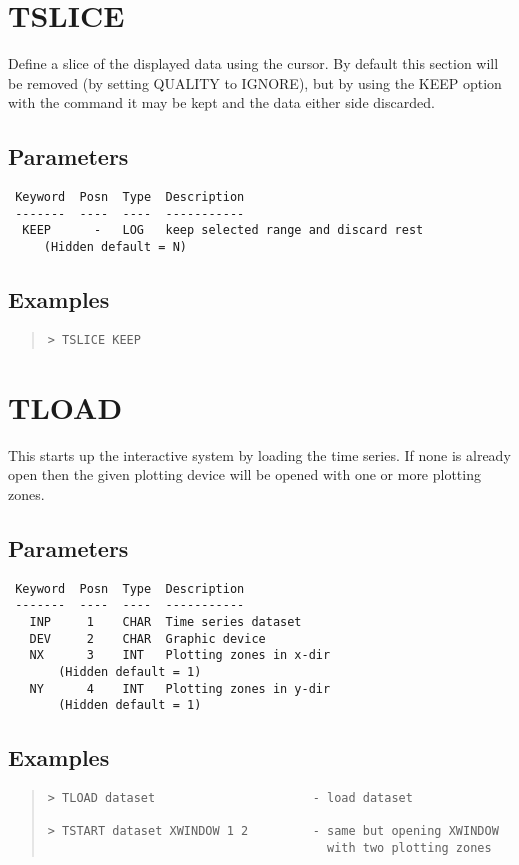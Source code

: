 \documentclass{book}
\renewcommand{\_}{{\tt\char'137}}     %
\begin{document}
\section{TSLICE}
Define a slice of the displayed data using the cursor. By
default this section will be removed (by setting QUALITY to IGNORE),
but by using the KEEP option with the command it may be kept and
the data either side discarded.

\subsection{Parameters}
\begin{verbatim}
 Keyword  Posn  Type  Description
 -------  ----  ----  -----------
  KEEP      -   LOG   keep selected range and discard rest
     (Hidden default = N)

\end{verbatim}\subsection{Examples}
\begin{quote}\begin{verbatim}
> TSLICE KEEP
\end{verbatim}\end{quote}
\section{TLOAD}
This starts up the interactive system by loading the time series.
If none is already open then the given plotting device will be opened
with one or more plotting zones.

\subsection{Parameters}
\begin{verbatim}
 Keyword  Posn  Type  Description
 -------  ----  ----  -----------
   INP     1    CHAR  Time series dataset
   DEV     2    CHAR  Graphic device
   NX      3    INT   Plotting zones in x-dir
       (Hidden default = 1)
   NY      4    INT   Plotting zones in y-dir
       (Hidden default = 1)

\end{verbatim}\subsection{Examples}
\begin{quote}\begin{verbatim}
> TLOAD dataset                      - load dataset

> TSTART dataset XWINDOW 1 2         - same but opening XWINDOW
                                       with two plotting zones
\end{verbatim}\end{quote}
\end{document}
